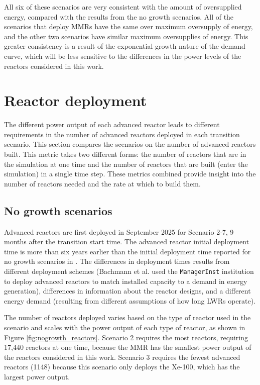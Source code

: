 All six of these scenarios are very consistent with the amount 
of oversupplied energy, compared with the results from the no growth 
scenarios. All of the scenarios that deploy \glspl{MMR} have the 
same over maximum oversupply of energy, and the other two scenarios 
have similar maximum oversupplies of energy. This greater consistency 
is a result of the exponential growth nature of the demand curve, which 
will be less sensitive to the differences in the power levels of 
the reactors considered in this work. 

\section{Reactor deployment}
The different power output of each advanced reactor leads to different 
requirements in the number of advanced reactors deployed in each transition 
scenario. 
This section compares the scenarios on the number of advanced reactors 
built. This metric takes two 
different forms: the number of reactors that are in the simulation at 
one time and the number of reactors that are built (enter the simulation)
in a single time step. These metrics combined provide insight into the 
number of reactors needed and the rate at which to build them. 

\subsection{No growth scenarios} \label{sec:nogrowth_reactors}
Advanced reactors are first deployed in September 2025 for Scenario 2-7, 
9 months after the transition start time. The advanced reactor initial 
deployment time is more than six years earlier than the initial deployment 
time reported for no growth scenarios in 
\cite{bachmann_enrichment_2021}. The differences in deployment times results 
from different deployment schemes (Bachmann et al. used the \Cycamore 
\texttt{ManagerInst} institution to deploy advanced reactors to match installed 
capacity to a demand in energy generation), differences 
in information about the reactor designs, and a different energy demand 
(resulting from different assumptions of how long \glspl{LWR} operate). 

The number of reactors deployed varies based on 
the type of reactor used in the scenario and scales with the power output of 
each type of reactor, as shown in Figure \ref{fig:nogrowth_reactors}. Scenario
2 requires the most reactors, requiring 17,440 reactors at one time, 
because the \gls{MMR} has the smallest power output of the reactors 
considered in this work. Scenario 3 requires the fewest 
advanced reactors (1148) because this scenario only deploys the Xe-100,
which has the largest power output. 

